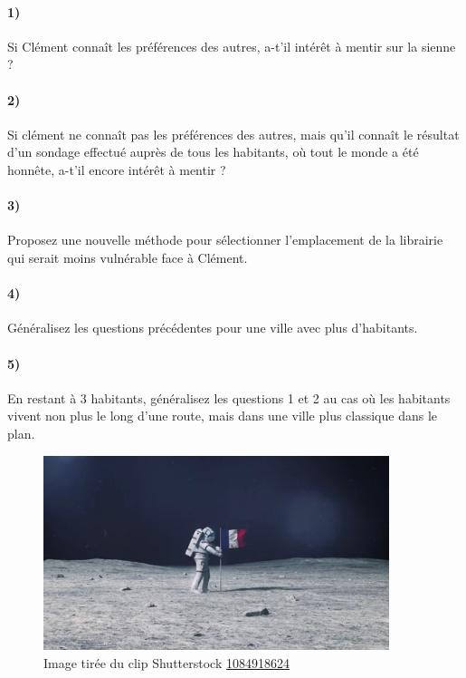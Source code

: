 \documentclass[a4paper,10pt,oneside]{article}
\begin{document}
\paragraph*{1)} 
Si Clément connaît les préférences des autres, a-t'il intérêt à mentir sur la sienne ?

\paragraph*{2)} 
Si clément ne connaît pas les préférences des autres, mais qu'il connaît le résultat d'un sondage effectué auprès de tous les habitants, où tout le monde a été honnête, a-t'il encore intérêt à mentir ?

\paragraph*{3)} 
Proposez une nouvelle méthode pour sélectionner l'emplacement de la librairie qui serait moins vulnérable face à Clément.

\paragraph*{4)} 
Généralisez les questions précédentes pour une ville avec plus d'habitants.

\paragraph*{5)} 
En restant à 3 habitants, généralisez les questions 1 et 2 au cas où les habitants vivent non plus le long d'une route, mais dans une ville plus classique dans le plan. 


\vspace{3cm}
\begin{figure}[!ht]
  \centering
  \includegraphics[width=0.9\textwidth]{figures/flag.png}
  \caption*{Image tirée du clip Shutterstock 
  \href{https://www.shutterstock.com/video/clip-1084918624-astronaut-outer-space-on-surface-moon-planting}{1084918624}}
\end{figure}
\end{document}

